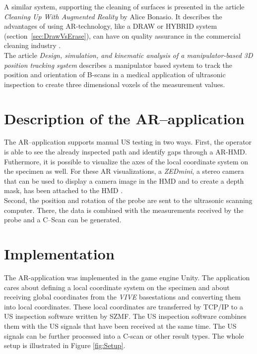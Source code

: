 \documentclass{VRARWorkshop}
\begin{document}
A similar system, supporting the cleaning of surfaces is presented in the article \textit{Cleaning Up With Augmented Reality} by Alice Bonasio.
It describes the advantages of using AR-technology, like a DRAW or HYBRID system (section~\ref{sec:DrawVsErase}), can have on quality assurance in the commercial cleaning industry \cite{ARClean}.\\

The article \textit{Design, simulation, and kinematic analysis of a manipulator-based 3D position tracking system} describes a manipulator based system to track the position and orientation of B-scans in a medical application of ultrasonic inspection to create three dimensional voxels of the measurement values.
\cite{fadzil_design_2015}\\


\section{Description of the AR--application}
The AR--application supports manual US testing in two ways. First, 
the operator is able to see the already inspected path and identify gaps through a AR-HMD. 
Futhermore, it is possible to visualize the axes of the local coordinate system on the specimen as well.
For these AR visualizations, a \textit{ZEDmini}, a stereo camera that can be used to display a camera image in the HMD and to create a depth mask, has been attached to the HMD \cite{dorner_virtual_2013}. \\
Second, the position and rotation of the probe are sent to the ultrasonic scanning computer.
There, the data is combined with the measurements received by the probe and a C--Scan can be 
generated.

\section{Implementation}
The AR-application was implemented in the game engine Unity. The application cares about defining a local coordinate 
system on the specimen and about receiving 
global coordinates from the \textit{VIVE} basestations 
and converting them into local coordinates.
These local coordinates are transferred by TCP/IP to a US inspection software written by SZMF.
The US inspection software combines them with the US signals that have been received
at the same time. The US signals can be further processed into a C-scan or other result types.
The whole setup is illustrated in Figure \ref{fig:Setup}. \\
\end{document}

